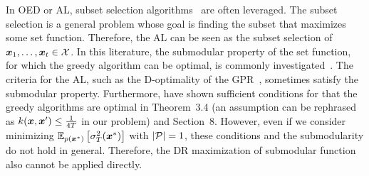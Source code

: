 In OED or AL, subset selection algorithms~\citep{das2008algorithms} are often leveraged.
%
The subset selection is a general problem whose goal is finding the subset that maximizes some set function.
%
Therefore, the AL can be seen as the subset selection of $\boldsymbol{x}_1, \dots, \boldsymbol{x}_t \in {\cal X}$.
%
In this literature, the submodular property of the set function, for which the greedy algorithm can be optimal, is commonly investigated~\citep{das2008algorithms,krause2008-near,Guestrin2005-near,bian2017guarantees}.
%
The criteria for the AL, such as the D-optimality of the GPR~\citep{krause2008-near,Guestrin2005-near}, sometimes satisfy the submodular property.
%
%
Furthermore, \citet{das2008algorithms} have shown sufficient conditions for that the greedy algorithms are optimal in Theorem~3.4 (an assumption can be rephrased as $k(\boldsymbol{x}, \boldsymbol{x}^\prime) \leq \frac{1}{4T}$ in our problem) and Section~8.
%
However, even if we consider minimizing $\mathbb{E}_{p(\boldsymbol{x}^*)}\left[ \sigma_T^2 (\boldsymbol{x}^*) \right]$ with $|{\cal P}| = 1$, these conditions and the submodularity do not hold in general.
%
Therefore, the DR maximization of submodular function~\citep[e.g., ][]{krause2008robust,staib2019distributionally} also cannot be applied directly.






